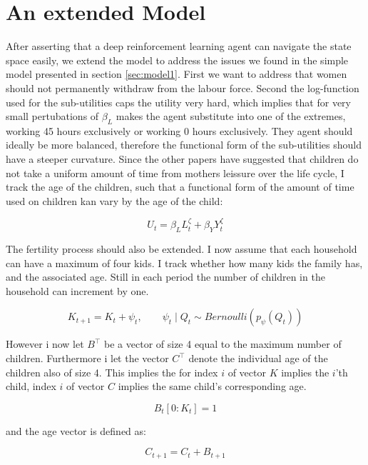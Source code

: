 \section{An extended Model}

After asserting that a deep reinforcement learning agent can navigate the state space easily, we extend the model to address the issues we found in the simple model presented in section \ref{sec:model1}. First we want to address that women should not permanently withdraw from the labour force. Second the log-function used for the sub-utilities caps the utility very hard, which implies that for very small pertubations of $\beta_L$ makes the agent substitute into one of the extremes, working 45 hours exclusively or working 0 hours exclusively. They agent should ideally be more balanced, therefore the functional form of the sub-utilities should have a steeper curvature. Since the other papers have suggested that children do not take a uniform amount of time from mothers leissure over the life cycle, I track the age of the children, such that a functional form of the amount of time used on children kan vary by the age of the child:

\begin{equation}
    U_t = \beta_L L_{t}^\zeta + \beta_Y Y_t^{\zeta}
\end{equation}

The fertility process should also be extended. I now assume that each household can have a maximum of four kids. I track whether how many kids the family has, and the associated age. Still in each period the number of children in the household can increment by one.

\begin{equation}
    K_{t+1} = K_t+ \psi_t, \qquad \psi_t \mid Q_t \sim Bernoulli (p_\psi(Q_t))
\end{equation}

However i now let $B^\top$ be a vector of size 4 equal to the maximum number of children. Furthermore i let the vector $C^\top$ denote the individual age of the children also of size 4. This implies the for index $i$ of vector $K$ implies the $i$'th child, index $i$ of vector $C$ implies the same child's corresponding age.

\begin{equation}
    B_{t} [0:K_t] = 1 
\end{equation}

and the age vector is defined as:

\begin{equation}
    C_{t+1} = C_t + B_{t+1}
\end{equation}

